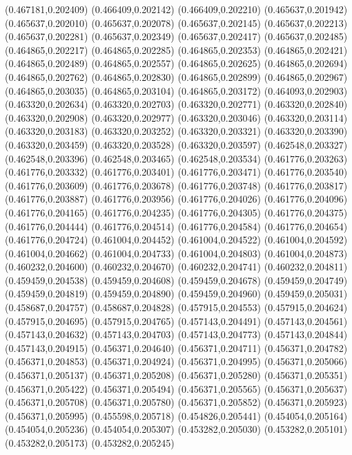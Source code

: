 (0.467181,0.202409)
(0.466409,0.202142)
(0.466409,0.202210)
(0.465637,0.201942)
(0.465637,0.202010)
(0.465637,0.202078)
(0.465637,0.202145)
(0.465637,0.202213)
(0.465637,0.202281)
(0.465637,0.202349)
(0.465637,0.202417)
(0.465637,0.202485)
(0.464865,0.202217)
(0.464865,0.202285)
(0.464865,0.202353)
(0.464865,0.202421)
(0.464865,0.202489)
(0.464865,0.202557)
(0.464865,0.202625)
(0.464865,0.202694)
(0.464865,0.202762)
(0.464865,0.202830)
(0.464865,0.202899)
(0.464865,0.202967)
(0.464865,0.203035)
(0.464865,0.203104)
(0.464865,0.203172)
(0.464093,0.202903)
(0.463320,0.202634)
(0.463320,0.202703)
(0.463320,0.202771)
(0.463320,0.202840)
(0.463320,0.202908)
(0.463320,0.202977)
(0.463320,0.203046)
(0.463320,0.203114)
(0.463320,0.203183)
(0.463320,0.203252)
(0.463320,0.203321)
(0.463320,0.203390)
(0.463320,0.203459)
(0.463320,0.203528)
(0.463320,0.203597)
(0.462548,0.203327)
(0.462548,0.203396)
(0.462548,0.203465)
(0.462548,0.203534)
(0.461776,0.203263)
(0.461776,0.203332)
(0.461776,0.203401)
(0.461776,0.203471)
(0.461776,0.203540)
(0.461776,0.203609)
(0.461776,0.203678)
(0.461776,0.203748)
(0.461776,0.203817)
(0.461776,0.203887)
(0.461776,0.203956)
(0.461776,0.204026)
(0.461776,0.204096)
(0.461776,0.204165)
(0.461776,0.204235)
(0.461776,0.204305)
(0.461776,0.204375)
(0.461776,0.204444)
(0.461776,0.204514)
(0.461776,0.204584)
(0.461776,0.204654)
(0.461776,0.204724)
(0.461004,0.204452)
(0.461004,0.204522)
(0.461004,0.204592)
(0.461004,0.204662)
(0.461004,0.204733)
(0.461004,0.204803)
(0.461004,0.204873)
(0.460232,0.204600)
(0.460232,0.204670)
(0.460232,0.204741)
(0.460232,0.204811)
(0.459459,0.204538)
(0.459459,0.204608)
(0.459459,0.204678)
(0.459459,0.204749)
(0.459459,0.204819)
(0.459459,0.204890)
(0.459459,0.204960)
(0.459459,0.205031)
(0.458687,0.204757)
(0.458687,0.204828)
(0.457915,0.204553)
(0.457915,0.204624)
(0.457915,0.204695)
(0.457915,0.204765)
(0.457143,0.204491)
(0.457143,0.204561)
(0.457143,0.204632)
(0.457143,0.204703)
(0.457143,0.204773)
(0.457143,0.204844)
(0.457143,0.204915)
(0.456371,0.204640)
(0.456371,0.204711)
(0.456371,0.204782)
(0.456371,0.204853)
(0.456371,0.204924)
(0.456371,0.204995)
(0.456371,0.205066)
(0.456371,0.205137)
(0.456371,0.205208)
(0.456371,0.205280)
(0.456371,0.205351)
(0.456371,0.205422)
(0.456371,0.205494)
(0.456371,0.205565)
(0.456371,0.205637)
(0.456371,0.205708)
(0.456371,0.205780)
(0.456371,0.205852)
(0.456371,0.205923)
(0.456371,0.205995)
(0.455598,0.205718)
(0.454826,0.205441)
(0.454054,0.205164)
(0.454054,0.205236)
(0.454054,0.205307)
(0.453282,0.205030)
(0.453282,0.205101)
(0.453282,0.205173)
(0.453282,0.205245)
